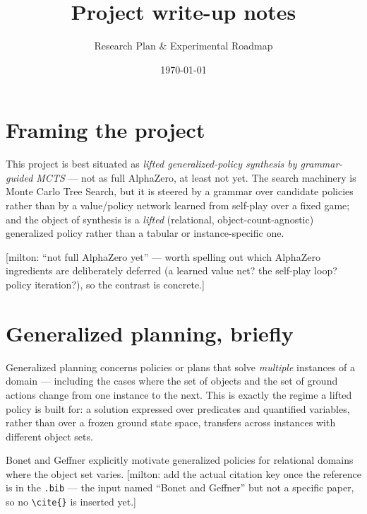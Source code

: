 \documentclass[11pt, a4paper]{article}
\title{Project write-up notes}
\author{Research Plan \& Experimental Roadmap}
\date{\today}
\theoremstyle{definition}
\newcommand{\milton}[1]{\textcolor{blue!55}{[milton: #1]}}
\begin{document}
\maketitle

\section{Framing the project}

This project is best situated as \emph{lifted generalized-policy synthesis by
grammar-guided MCTS} --- not as full AlphaZero, at least not yet. The search
machinery is Monte Carlo Tree Search, but it is steered by a grammar over
candidate policies rather than by a value/policy network learned from self-play
over a fixed game; and the object of synthesis is a \emph{lifted} (relational,
object-count-agnostic) generalized policy rather than a tabular or
instance-specific one.

\milton{``not full AlphaZero yet'' --- worth spelling out which AlphaZero
ingredients are deliberately deferred (a learned value net? the self-play loop?
policy iteration?), so the contrast is concrete.}

\section{Generalized planning, briefly}

Generalized planning concerns policies or plans that solve \emph{multiple}
instances of a domain --- including the cases where the set of objects and the
set of ground actions change from one instance to the next. This is exactly the
regime a lifted policy is built for: a solution expressed over predicates and
quantified variables, rather than over a frozen ground state space, transfers
across instances with different object sets.

Bonet and Geffner explicitly motivate generalized policies for relational
domains where the object set varies. \milton{add the actual citation key once
the reference is in the \texttt{.bib} --- the input named ``Bonet and Geffner''
but not a specific paper, so no \texttt{\textbackslash cite\{\}} is inserted
yet.}
\end{document}

